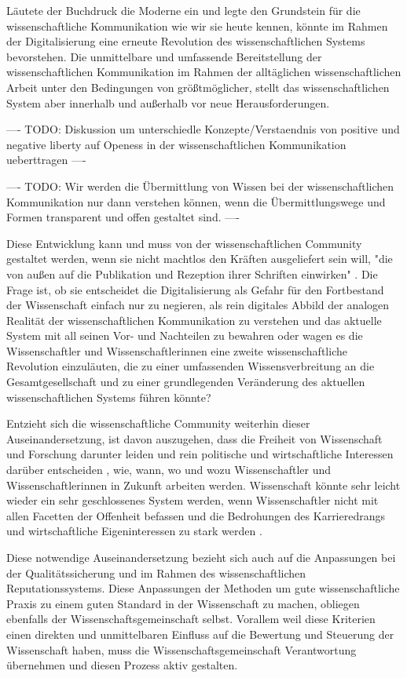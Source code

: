 Läutete der Buchdruck die Moderne ein und legte den Grundstein für die wissenschaftliche Kommunikation wie wir sie heute kennen, könnte im Rahmen der Digitalisierung eine erneute Revolution des wissenschaftlichen Systems bevorstehen. Die unmittelbare und umfassende Bereitstellung der wissenschaftlichen Kommunikation im Rahmen der alltäglichen wissenschaftlichen Arbeit unter den Bedingungen von größtmöglicher, stellt das wissenschaftlichen System aber innerhalb und außerhalb vor neue Herausforderungen.

---- TODO: Diskussion um unterschiedle Konzepte/Verstaendnis von positive und negative liberty \cite{kelty_2014_freedom} auf Openess in der wissenschaftlichen Kommunikation ueberttragen ----

---- TODO: Wir werden die Übermittlung von Wissen bei der wissenschaftlichen Kommunikation nur dann verstehen können, wenn die Übermittlungswege und Formen transparent und offen gestaltet sind. \cite{davis_2011_open} ----

Diese Entwicklung kann und muss von der wissenschaftlichen Community gestaltet werden, wenn sie nicht machtlos den Kräften ausgeliefert sein will, "die von außen auf die Publikation und Rezeption ihrer Schriften einwirken" \cite{Hirschi_2015_buch_oa}. Die Frage ist, ob sie entscheidet die Digitalisierung als Gefahr für den Fortbestand der Wissenschaft einfach nur zu negieren, als rein digitales Abbild der analogen Realität der wissenschaftlichen Kommunikation zu verstehen und das aktuelle System mit all seinen Vor- und Nachteilen zu bewahren oder wagen es die Wissenschaftler und Wissenschaftlerinnen eine zweite wissenschaftliche Revolution einzuläuten, die zu einer umfassenden Wissensverbreitung an die Gesamtgesellschaft und zu einer grundlegenden Veränderung des aktuellen wissenschaftlichen Systems führen könnte?

Entzieht sich die wissenschaftliche Community weiterhin dieser Auseinandersetzung, ist davon auszugehen, dass die Freiheit von Wissenschaft und Forschung darunter leiden und rein politische und wirtschaftliche Interessen darüber entscheiden \cite{Warnke_2012}, wie, wann, wo und wozu Wissenschaftler und Wissenschaftlerinnen in Zukunft arbeiten werden. Wissenschaft könnte sehr leicht wieder ein sehr geschlossenes System werden, wenn Wissenschaftler nicht mit allen Facetten der Offenheit befassen und die Bedrohungen des Karrieredrangs und wirtschaftliche Eigeninteressen zu stark werden \cite{resnik_2005_ethics}.

Diese notwendige Auseinandersetzung bezieht sich auch auf die Anpassungen bei der Qualitätssicherung und im Rahmen des wissenschaftlichen Reputationssystems. Diese Anpassungen der Methoden um gute wissenschaftliche Praxis zu einem guten Standard in der Wissenschaft zu machen, obliegen ebenfalls der Wissenschaftsgemeinschaft selbst. Vorallem weil diese Kriterien einen direkten und unmittelbaren Einfluss auf die Bewertung und Steuerung der Wissenschaft haben, muss die Wissenschaftsgemeinschaft Verantwortung übernehmen und diesen Prozess aktiv gestalten.

